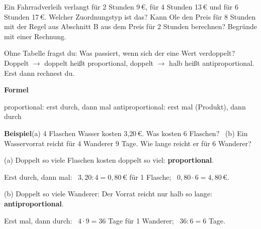 \documentclass[11pt]{article}
\makeatletter
\newcommand{\aufg}[3]{\par\noindent\makebox[0pt][r]{#3}\begin{minipage}[t]{\linewidth}#1\end{minipage}\par}
\newcommand{\nr}[1]{\makebox[7mm][l]{\textbf{#1}}}
\newlength{\kr}
\newcommand{\karomerk}[2]{\protected@write\@auxout{}{\string\karoseite{#1}{#2}{\thepage}}}
\newcommand{\karoseite}[3]{\expandafter\xdef\csname karo@#1@#2\endcsname{#3}}
\makeatother
\begin{document}
\medskip
\aufg{\nr{5.}Ein Fahrradverleih verlangt für 2 Stunden 9\,€, für 4 Stunden 13\,€ und für 6 Stunden 17\,€. Welcher Zuordnungstyp ist das? Kann Ole den Preis für 8 Stunden mit der Regel aus Abschnitt B aus dem Preis für 2 Stunden berechnen? Begründe mit einer Rechnung.}{}{{\scriptsize\color{mbgrau}Ziel\hspace{2mm}}}
\medskip
\par\vspace{3mm}\setlength{\kr}{\dimexpr\pagegoal-\pagetotal-10mm\relax}%
\ifdim\kr>12mm\karomerk{k}{A}\noindent{\scriptsize\color{mbgrau}Platz zum Rechnen}\par\nointerlineskip\vspace{1mm}\noindent
\begin{tikzpicture}\clip (0,0) rectangle ({\linewidth-0.5mm},\kr);\draw[black!16,line width=0.3pt,step=5mm] (0,0) grid (\linewidth,\kr);\end{tikzpicture}\fi\par
\clearpage\label{s:B}\noindent\colorbox{black!12}{}\hspace{3mm}{\Large\bfseries Am Text erkennen, dann rechnen}\par\smallskip
\noindent Ohne Tabelle fragst du: Was passiert, wenn sich der eine Wert verdoppelt? Doppelt $\to$ doppelt heißt proportional, doppelt $\to$ halb heißt antiproportional. Erst dann rechnest du.\par\medskip
\noindent\textbf{Formel}\par\nopagebreak\noindent\hspace*{4mm}\begin{minipage}{\dimexpr\linewidth-4mm\relax}proportional: erst durch, dann mal \qquad antiproportional: erst mal (Produkt), dann durch\end{minipage}\par\medskip
\noindent\textbf{Beispiel}\quad (a) 4 Flaschen Wasser kosten 3{,}20\,€. Was kosten 6 Flaschen? \ (b) Ein Wasservorrat reicht für 4 Wanderer 9 Tage. Wie lange reicht er für 6 Wanderer?\par\smallskip
\noindent\par\noindent{}(a) Doppelt so viele Flaschen kosten doppelt so viel: \textbf{proportional}.\par\smallskip\par\noindent{}Erst durch, dann mal: \ $3{,}20 : 4 = 0{,}80$\,€ für 1 Flasche; \ $0{,}80 \cdot 6 = 4{,}80$\,€.\par\smallskip\par\noindent{}(b) Doppelt so viele Wanderer: Der Vorrat reicht nur halb so lange: \textbf{antiproportional}.\par\smallskip\par\noindent{}Erst mal, dann durch: \ $4 \cdot 9 = 36$ Tage für 1 Wanderer; \ $36 : 6 = 6$ Tage.\par\smallskip\par\medskip
\end{document}
